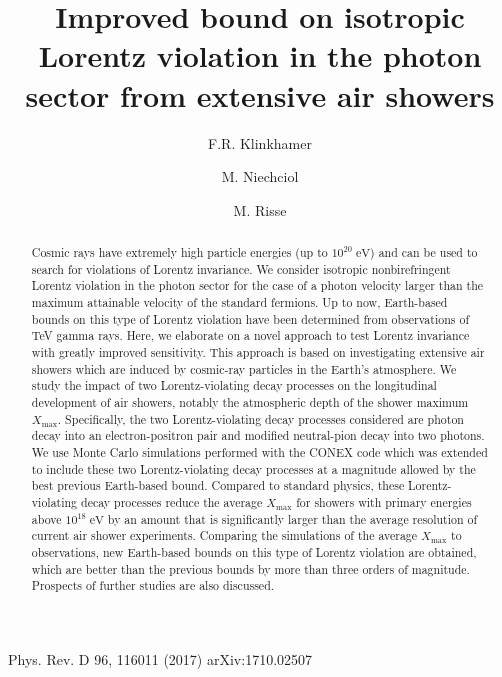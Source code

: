 \documentclass[aps,prd,preprint,longbibliography]{revtex4-1}
\newcommand{\version}{v4}  %
\begin{document}


\noindent Phys. Rev. D 96, 116011 (2017)
\hfill arXiv:1710.02507 %
%
\vspace*{4mm}

\title{Improved bound on isotropic Lorentz violation
in the photon sector from extensive air showers}

\author{F.R. Klinkhamer}
\author{M. Niechciol}
\author{M. Risse}

\begin{abstract}
\vspace*{2mm}
Cosmic rays have extremely high particle energies
(up to $10^{20} \; \text{eV}$) and can be used to search for
violations of Lorentz invariance. We consider isotropic
nonbirefringent Lorentz violation in the photon sector for
the case of a photon velocity larger than the maximum
attainable velocity of the standard fermions. Up to now,
Earth-based bounds on
this type of Lorentz violation have been determined from
observations of TeV gamma rays.
Here, we elaborate on a novel approach to test Lorentz
invariance with greatly improved sensitivity. This approach is based on
investigating extensive air showers which are induced by cosmic-ray
particles in the Earth's atmosphere. We study the impact of
two Lorentz-violating decay processes
on the longitudinal development of air showers,
notably the atmospheric depth of the shower maximum $X_\text{max}$.
Specifically, the two Lorentz-violating decay processes considered
are photon decay
into an electron-positron pair and modified neutral-pion decay
into two photons.
We use Monte Carlo simulations performed with the
CONEX code which was extended to include
these two Lorentz-violating decay processes
at a magnitude allowed by the best previous Earth-based bound.
Compared to standard physics, these Lorentz-violating decay processes
reduce the average $X_\text{max}$
for showers with primary energies above $10^{18}\;\text{eV}$
by an amount that is significantly larger
than the average resolution of current air shower experiments.
Comparing the simulations of the average $X_\text{max}$
to observations, new Earth-based bounds on this
type of Lorentz violation are obtained, which are better
than the previous bounds by more than three orders of magnitude.
Prospects of further studies are also discussed.
\end{abstract}
\end{document}
